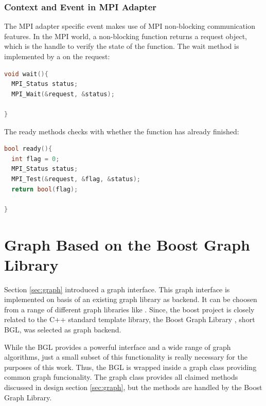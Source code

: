 \subsubsection{Context and Event in MPI Adapter}
The MPI adapter specific event makes use of MPI non-blocking
communication features. In the MPI world, a non-blocking function
returns a request object, which is the handle to verify the state of
the function. The wait method is implemented by a  on
the request:

\begin{lstlisting}[language=C++, label=lst:mpi_event_wait]
void wait(){
  MPI_Status status;
  MPI_Wait(&request, &status);

}
\end{lstlisting}

The ready methods checks with  whether the function has
already finished:

\begin{lstlisting}[language=C++, label=lst:mpi_event_ready]
bool ready(){
  int flag = 0;
  MPI_Status status;
  MPI_Test(&request, &flag, &status);
  return bool(flag);

}
\end{lstlisting}

\section{Graph Based on the Boost Graph Library}

Section \ref{sec:graph} introduced a graph interface.  This graph
interface is implemented on basis of an existing graph library as
backend. It can be choosen from a range of different graph libraries
like \cite{ref:lemon, ref:boost_bgl, ref:igraph, ref:ogdf}.
Since, the boost project is closely related to the C++ standard
template library, the Boost Graph Library \cite{ref:boost_bgl}, short
BGL, was selected as graph backend.

While the BGL provides a powerful interface and a wide range of graph
algorithms, just a small subset of this functionality is really
necessary for the purposes of this work. Thus, the BGL is wrapped
inside a graph class providing common graph funcionality.  The
graph class provides all claimed methods discussed in design section
\ref{sec:graph}, but the methods are handled by the Boost Graph Library.


